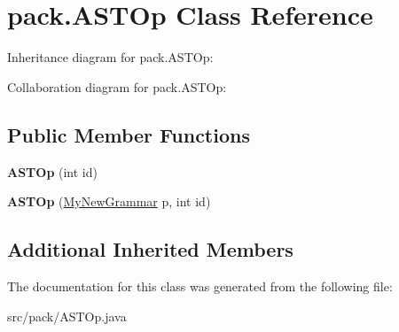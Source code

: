\hypertarget{classpack_1_1_a_s_t_op}{}\section{pack.\+A\+S\+T\+Op Class Reference}
\label{classpack_1_1_a_s_t_op}


Inheritance diagram for pack.\+A\+S\+T\+Op\+:


Collaboration diagram for pack.\+A\+S\+T\+Op\+:
\subsection*{Public Member Functions}
\begin{DoxyCompactItemize}
\item 
{\bfseries A\+S\+T\+Op} (int id)\hypertarget{classpack_1_1_a_s_t_op_ad2c2bb75e67d77a9be42f0996e2ab410}{}\label{classpack_1_1_a_s_t_op_ad2c2bb75e67d77a9be42f0996e2ab410}

\item 
{\bfseries A\+S\+T\+Op} (\hyperlink{classpack_1_1_my_new_grammar}{My\+New\+Grammar} p, int id)\hypertarget{classpack_1_1_a_s_t_op_aecd0ce6e85d37e5e4ec0ccc233735123}{}\label{classpack_1_1_a_s_t_op_aecd0ce6e85d37e5e4ec0ccc233735123}

\end{DoxyCompactItemize}
\subsection*{Additional Inherited Members}


The documentation for this class was generated from the following file\+:\begin{DoxyCompactItemize}
\item 
src/pack/A\+S\+T\+Op.\+java\end{DoxyCompactItemize}
